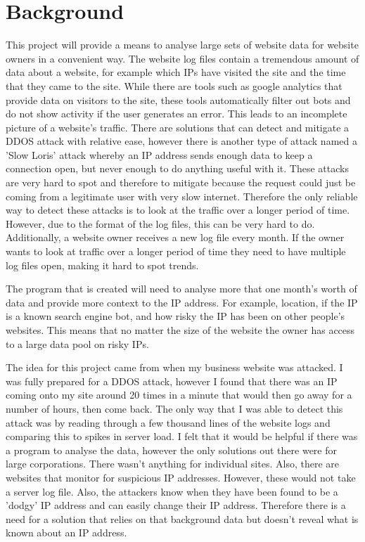 
\section{Background}
This project will provide a means to analyse large sets of website data for website owners in a convenient way. The website log files contain a tremendous amount of data about a website, for example which IPs have visited the site and the time that they came to the site. While there are tools such as google analytics that provide data on visitors to the site, these tools automatically filter out bots and do not show activity if the user generates an error. This leads to an incomplete picture of a website's traffic. There are solutions that can detect and mitigate a DDOS attack with relative ease, however there is another type of attack named a 'Slow Loris' attack whereby an IP address sends enough data to keep a connection open, but never enough to do anything useful with it. These attacks are very hard to spot and therefore to mitigate because the request could just be coming from a legitimate user with very slow internet. Therefore the only reliable way to detect these attacks is to look at the traffic over a longer period of time. However, due to the format of the log files, this can be very hard to do. Additionally, a website owner receives a new log file every month. If the owner wants to look at traffic over a longer period of time they need to have multiple log files open, making it hard to spot trends.

The program that is created will need to analyse more that one month's worth of data and provide more context to the IP address. For example, location, if the IP is a known search engine bot, and how risky the IP has been on other people's websites. This means that no matter the size of the website the owner has access to a large data pool on risky IPs. 

The idea for this project came from when my business website was attacked. I was fully prepared for a DDOS attack, however I found that there was an IP coming onto my site around 20 times in a minute that would then go away for a number of hours, then come back. The only way that I was able to detect this attack was by reading through a few thousand lines of the website logs and comparing this to spikes in server load. I felt that it would be helpful if there was a program to analyse the data, however the only solutions out there were for large corporations. There wasn't anything for individual sites. Also, there are websites that monitor for suspicious IP addresses. However, these would not take a server log file. Also, the attackers know when they have been found to be a 'dodgy' IP address and can easily change their IP address. Therefore there is a need for a solution that relies on that background data but doesn't reveal what is known about an IP address.
